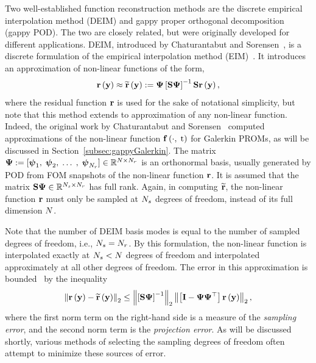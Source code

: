 Two well-established function reconstruction methods are the discrete empirical interpolation method (DEIM) and gappy proper orthogonal decomposition (gappy POD). The two are closely related, but were originally developed for different applications. DEIM, introduced by Chaturantabut and Sorensen~\cite{Chaturantabut2010}, is a discrete formulation of the empirical interpolation method (EIM)~\cite{Barrault2004}. It introduces an approximation of non-linear functions of the form,
%
\begin{equation}\label{eq:deimRHSApprox}
    \resFunc{\dummyVec} \approx \resApproxFunc{\dummyVec} \defEq \deimBasis \left[ \sampMat \deimBasis \right]^{-1} \sampMat \resFunc{\dummyVec},
\end{equation}
%
where the residual function $\mathbf{r}$ is used for the sake of notational simplicity, but note that this method extends to approximation of any non-linear function. Indeed, the original work by Chaturantabut and Sorensen~\cite{Chaturantabut2010} computed approximations of the non-linear function $\mathbf{f} \left(\cdot, \; \text{t}\right)$ for Galerkin PROMs, as will be discussed in Section~\ref{subsec:gappyGalerkin}. The matrix $\deimBasis \defEq [\deimBasisVec_1, \; \deimBasisVec_2, \; \hdots \;, \; \deimBasisVec_{\numResModes}] \inRTwo{\numDOF}{\numResModes}$ is an orthonormal basis, usually generated by POD from FOM snapshots of the non-linear function $\mathbf{r}$. It is assumed that the matrix $\sampMat \deimBasis \inRTwo{\numSamps}{\numResModes}$ has full rank. Again, in computing $\mathbf{\widetilde{r}}$, the non-linear function $\mathbf{r}$ must only be sampled at $N_s$ degrees of freedom, instead of its full dimension $N$.

Note that the number of DEIM basis modes is equal to the number of sampled degrees of freedom, i.e., $N_s = N_r$. By this formulation, the non-linear function is interpolated exactly at $N_s < N$ degrees of freedom and interpolated approximately at all other degrees of freedom. The error in this approximation is bounded~\cite{Chaturantabut2010} by the inequality
%
\begin{equation}\label{eq:deimErrorBound}
   \left\Vert \resFunc{\dummyVec} - \resApproxFunc{\dummyVec} \right\Vert_2 \le \left\Vert \left[ \sampMat \deimBasis \right]^{-1} \right\Vert_2 \left\Vert \left[ \identMat - \deimBasis \deimBasis^\top \right] \resFunc{\dummyVec} \right\Vert_2,
\end{equation}
%
where the first norm term on the right-hand side is a measure of the \textit{sampling error}, and the second norm term is the \textit{projection error}. As will be discussed shortly, various methods of selecting the sampling degrees of freedom often attempt to minimize these sources of error.

